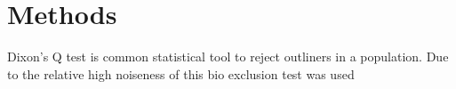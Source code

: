 \chapter{Methods}

Dixon's Q test is common statistical tool to reject outliners in a population. Due to the relative high noiseness of this bio  exclusion test was used 